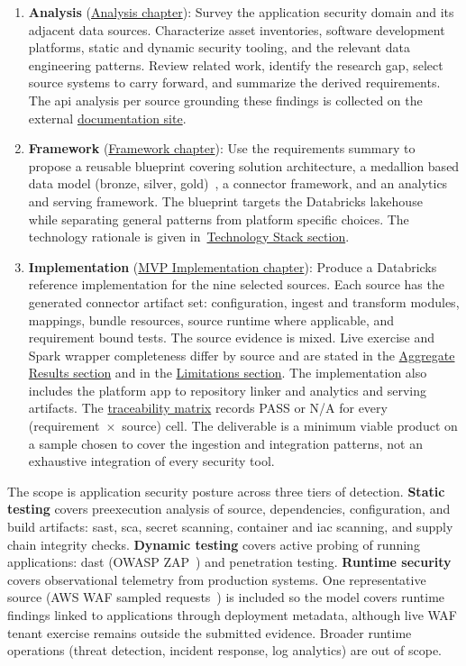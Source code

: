 \begin{enumerate}
    \item \textbf{Analysis} (\hyperref[ch:analysis]{Analysis chapter}): Survey the application security domain and its adjacent data sources. Characterize asset inventories, software development platforms, static and dynamic security tooling, and the relevant data engineering patterns. Review related work, identify the research gap, select source systems to carry forward, and summarize the derived requirements. The \gls{api} analysis per source grounding these findings is collected on the external \href{https://vkraus.github.io/appsec-mvp/}{documentation site}.
    \item \textbf{Framework} (\hyperref[ch:framework]{Framework chapter}): Use the requirements summary to propose a reusable blueprint covering solution architecture, a medallion based data model (bronze, silver, gold)~\parencite{Strengholt2025}, a connector framework, and an analytics and serving framework. The blueprint targets the Databricks lakehouse~\parencite{Lee2024, DatabricksUC2025, DatabricksLDP2025} while separating general patterns from platform specific choices. The technology rationale is given in~\hyperref[sec:tech-stack]{Technology Stack section}.
    \item \textbf{Implementation} (\hyperref[ch:implementation]{MVP Implementation chapter}): Produce a Databricks reference implementation for the nine selected sources. Each source has the generated connector artifact set: configuration, ingest and transform modules, mappings, bundle resources, source runtime where applicable, and requirement bound tests. The source evidence is mixed. Live exercise and Spark wrapper completeness differ by source and are stated in the \hyperref[sec:impl-results]{Aggregate Results section} and in the \hyperref[sec:conclusion-limitations]{Limitations section}. The implementation also includes the platform app to repository linker and analytics and serving artifacts. The \href{https://vkraus.github.io/appsec-mvp/platform/reference/catalog/}{traceability matrix} records PASS or N/A for every (requirement~$\times$~source) cell. The deliverable is a minimum viable product on a sample chosen to cover the ingestion and integration patterns, not an exhaustive integration of every security tool.
\end{enumerate}

The scope is application security posture across three tiers of detection. \textbf{Static testing} covers preexecution analysis of source, dependencies, configuration, and build artifacts: \gls{sast}, \gls{sca}, secret scanning, container and \gls{iac} scanning, and supply chain integrity checks. \textbf{Dynamic testing} covers active probing of running applications: \gls{dast} (OWASP ZAP~\parencite{OWASPZAP2024}) and penetration testing. \textbf{Runtime security} covers observational telemetry from production systems. One representative source (AWS WAF sampled requests~\parencite{AWSWAF2026}) is included so the model covers runtime findings linked to applications through deployment metadata, although live WAF tenant exercise remains outside the submitted evidence. Broader runtime operations (threat detection, incident response, log analytics) are out of scope.

